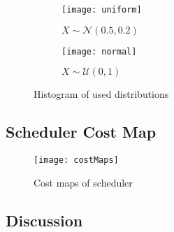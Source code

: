 \begin{figure}[htbp]
  \centering
  \begin{subfigure}[b]{0.49\textwidth}
      \centering
      \texttt{[image: uniform]}
      \caption{$X \sim \mathcal{N}(0.5, 0.2)$}
  \end{subfigure}
  \hfill
  \begin{subfigure}[b]{0.49\textwidth}
      \centering
      \texttt{[image: normal]}
      \caption{$X \sim \mathcal{U}(0, 1)$}
  \end{subfigure}
    \caption{Histogram of used distributions}
    \label{fig:randomCheck}
\end{figure}

\subsection{Scheduler Cost Map}

\begin{figure}[htbp]
  \centering
  \texttt{[image: costMaps]} 
  \caption{Cost maps of scheduler}
  \label{fig:costmaps}
\end{figure}

\subsection{Discussion}
